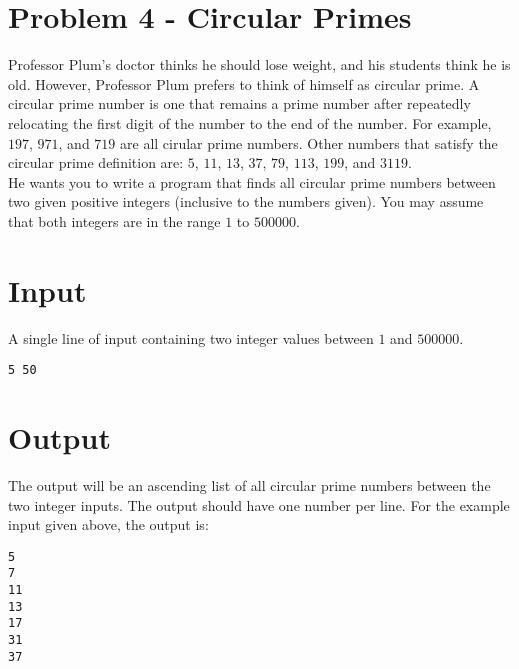 \documentclass{article}
\begin{document}

\section*{Problem 4 - Circular Primes}

Professor Plum’s doctor thinks he should lose weight, and his students think he is old. However, Professor Plum prefers to think of himself as circular prime. A circular prime number is one that remains a prime number after repeatedly relocating the first digit of the number to the end of the number.  For example, $197$, $971$, and $719$ are all cirular prime numbers. Other numbers that satisfy the circular prime definition are:  $5$, $11$, $13$, $37$, $79$, $113$, $199$, and $3119$.  \\

He wants you to write a program that finds all circular prime numbers between two given positive integers (inclusive to the numbers given). You may assume that both integers are in the range $1$ to $500000$.

\section*{Input}
A single line of input containing two integer values between $1$ and $500000$.  
\begin{verbatim}
5 50
\end{verbatim}

\section*{Output}
The output will be an ascending list of all circular prime numbers between the two integer inputs.  The output should have one number per line.  For the example input given above, the output is:

\begin{verbatim}
5
7
11
13
17
31
37
\end{verbatim}
\end{document}
